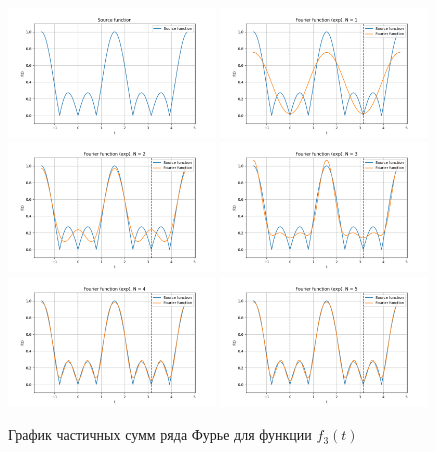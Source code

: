 \begin{figure}[ht!]
    \centering
    \includegraphics[width=0.49\textwidth]{media/plots/func_3.png}
    \includegraphics[width=0.49\textwidth]{media/plots/func_3_exp_N_1.png}
    \includegraphics[width=0.49\textwidth]{media/plots/func_3_exp_N_2.png}
    \includegraphics[width=0.49\textwidth]{media/plots/func_3_exp_N_3.png}
    \includegraphics[width=0.49\textwidth]{media/plots/func_3_exp_N_4.png}
    \includegraphics[width=0.49\textwidth]{media/plots/func_3_exp_N_5.png}
    \caption{График частичных сумм ряда Фурье для функции $f_3(t)$}
    \label{fig:func_3_plot_exp}
\end{figure}



